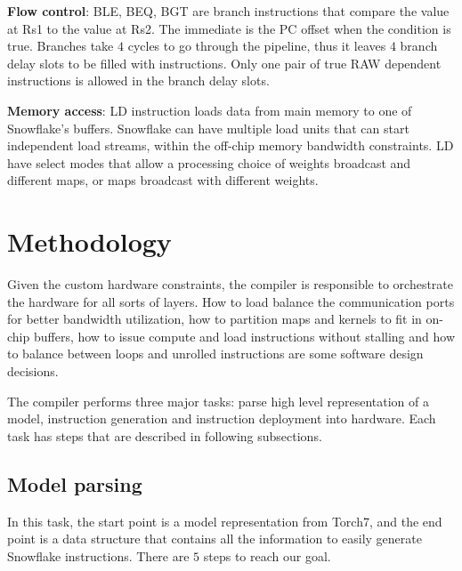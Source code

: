 \documentclass{sig-alternate}
\begin{document}
\textbf{Flow control}: BLE, BEQ, BGT are branch instructions that compare the value at Rs1 to the value at Rs2. The immediate is the PC offset when the condition is true. Branches take $4$ cycles to go through the pipeline, thus it leaves $4$ branch delay slots to be filled with instructions. Only one pair of true RAW dependent instructions is allowed in the branch delay slots.

\textbf{Memory access}: LD instruction loads data from main memory to one of Snowflake's buffers. Snowflake can have multiple load units that can start independent load streams, within the off-chip memory bandwidth constraints. LD have select modes that allow a processing choice of weights broadcast and different maps, or maps broadcast with different weights.

\section{Methodology}\label{sec:snowb}
Given the custom hardware constraints, the compiler is responsible to orchestrate the hardware for all sorts of layers. How to load balance the communication ports for better bandwidth utilization, how to partition maps and kernels to fit in on-chip buffers, how to issue compute and load instructions without stalling and how to balance between loops and unrolled instructions are some software design decisions.

The compiler performs three major tasks: parse high level representation of a model, instruction generation and instruction deployment into hardware. Each task has steps that are described in following subsections. 


\subsection{Model parsing}\label{sec:parse}
In this task, the start point is a model representation from Torch7, and the end point is a data structure that contains all the information to easily generate Snowflake instructions. There are $5$ steps to reach our goal.
\end{document}
